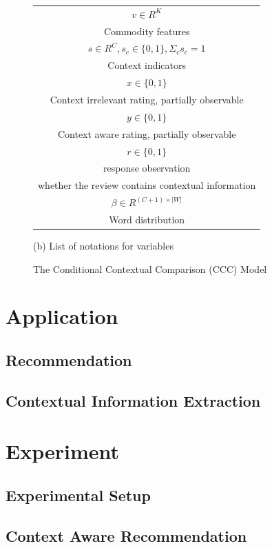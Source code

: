 \documentclass{llncs}
\begin{document}
\begin{figure}
\begin{minipage}[b]{.3\linewidth}
{\begin{tabular}{|c|}
$v \in R^K$ \\ Commodity features \\\hline
$s \in R^C, s_c\in \{0,1\}, \Sigma_c s_c =1$ \\ Context indicators \\\hline
$x \in \{0,1\}$ \\ Context irrelevant rating, partially observable \\\hline
$y \in \{0,1\}$ \\ Context aware rating, partially observable \\\hline
$r \in \{0,1\}$ \\  response observation\\whether the review contains contextual information\\\hline
$\beta \in R^{(C+1)\times |W|}$ \\ Word distribution \\\hline
\end{tabular}}
\vfill
\centerline{(b) List of notations for variables}
\end{minipage}
\caption{The Conditional Contextual Comparison (CCC) Model}
\end{figure}



\section{Application}\label{sec:method}
%

 
 
\subsection{ Recommendation}
\subsection{Contextual Information Extraction}


\section{Experiment}\label{sec:exp}
\subsection{Experimental Setup}

\subsection{Context Aware Recommendation}
\end{document}

